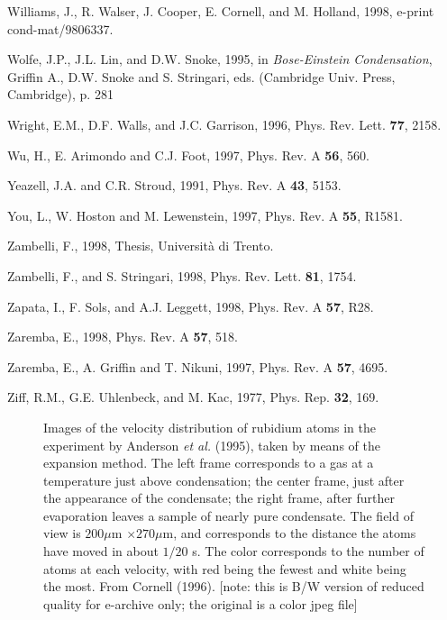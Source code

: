 \begin{references}
     Williams, J., R. Walser, J. Cooper, E. Cornell, 
and M. Holland, 1998, e-print cond-mat/9806337. 

      Wolfe, J.P., J.L. Lin, and D.W. Snoke, 1995, in
{\it Bose-Einstein Condensation}, Griffin A., D.W.  Snoke and S. Stringari,
eds. (Cambridge Univ.  Press, Cambridge), p. 281

     Wright, E.M., D.F. Walls, and J.C. Garrison,
1996, Phys. Rev. Lett. {\bf 77}, 2158.

           Wu, H., E. Arimondo and C.J. Foot, 1997, Phys.
Rev. A {\bf 56}, 560.

    Yeazell, J.A. and C.R. Stroud, 1991, Phys. Rev. A
{\bf 43}, 5153.

        You, L., W. Hoston and M. Lewenstein, 1997, Phys.
Rev. A {\bf 55}, R1581.

   Zambelli, F., 1998, Thesis, Universit\`a di
Trento.

  Zambelli, F., and S. Stringari, 1998, Phys. Rev.
Lett. {\bf 81}, 1754. 

     Zapata, I., F. Sols, and A.J. Leggett, 1998,
Phys. Rev. A {\bf 57}, R28.

    Zaremba, E., 1998, Phys. Rev. A {\bf 57}, 518.

      Zaremba, E., A. Griffin and T. Nikuni, 1997, 
Phys. Rev. A {\bf 57}, 4695. 

         Ziff, R.M., G.E. Uhlenbeck, and M. Kac, 1977, 
Phys. Rep. {\bf 32}, 169. 

\end{references}

\newpage

\begin{figure}[t]
\epsfysize=7cm
\hspace{3cm}
\caption{ Images of the velocity distribution of rubidium atoms in the
experiment by Anderson {\it et al.} (1995), taken by means of the 
expansion method. The left frame corresponds to a 
gas at a temperature just above condensation; the center frame, just 
after the appearance of the condensate; the right frame, after further 
evaporation leaves a sample of nearly pure condensate. The field of 
view is $200 \mu$m $\times 270 \mu$m, and corresponds to the distance the
atoms have moved in about $1/20$ s. The color corresponds to the number of 
atoms at each velocity, with red being the fewest and white being the
most. From Cornell (1996). [note: this is B/W version of reduced quality
for e-archive only; the original is a color jpeg file]  } 
\label{fig:threepeaks}
\end{figure}

